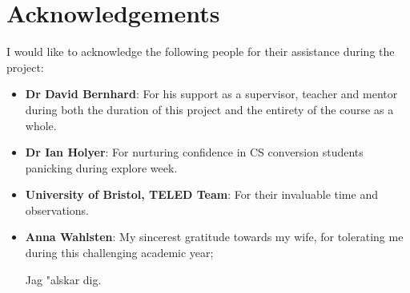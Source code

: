 \chapter*{Acknowledgements}
\begin{SingleSpace}

I would like to acknowledge the following people for their assistance during the project:

\begin{itemize}

    \item \textbf{Dr David Bernhard}: For his support as a supervisor, teacher and mentor  during both the duration of this project and the entirety of the course as a whole.
    
    \item \textbf{Dr Ian Holyer}: For nurturing confidence in CS conversion  students panicking during explore week.
    
    \item \textbf{University of Bristol, TELED Team}: For their invaluable time and observations.

    \item \textbf{Anna Wahlsten}: My sincerest gratitude towards my wife, for tolerating me during this challenging academic year;  \begin{otherlanguage}{swedish} Jag "alskar dig.\end{otherlanguage}
    
\end{itemize}
\end{SingleSpace}
